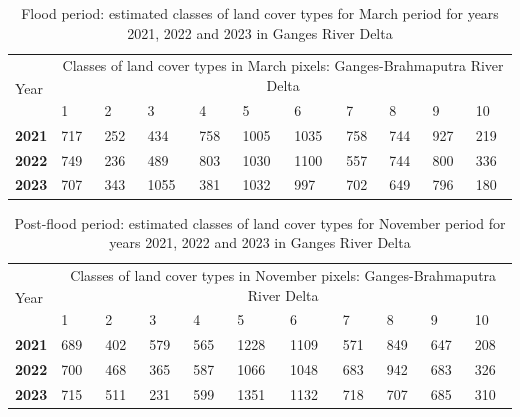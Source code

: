 \documentclass[water,article,submit,pdftex,moreauthors]{Definitions/mdpi}
\begin{document}
\begin{table}[H]
\caption{Flood period: estimated classes of land cover types for March period for years 2021, 2022 and 2023 in Ganges River Delta}
  \centering
  \begin{tabularx}{\textwidth}{p{0.9cm}p{0.9cm}p{0.9cm}p{0.9cm}p{0.9cm}p{0.9cm}p{0.9cm}p{0.9cm}p{0.9cm}p{0.9cm}p{0.9cm}}
  \toprule
  \multirow{2}{*}{Year} & \multicolumn{10}{c}{Classes of land cover types in March pixels: Ganges-Brahmaputra River Delta} \\
     & 1 & 2 & 3 & 4 & 5 & 6 & 7 & 8 & 9 & 10 \\
    \midrule
    \textbf{2021} & 717 & 252 & 434 & 758 & 1005 & 1035 & 758 & 744 & 927 & 219 \\
    \textbf{2022} &  749 & 236 & 489 & 803 & 1030 & 1100 & 557 & 744 & 800 & 336 \\
     \textbf{2023} &  707 & 343 & 1055 & 381 & 1032 & 997 & 702 & 649 & 796 & 180 \\
\bottomrule
\end{tabularx}
  \label{tab02}
\end{table}

\begin{table}[H]
 \caption{Post-flood period: estimated classes of land cover types for November period for years 2021, 2022 and 2023 in Ganges River Delta}
  \centering
  \begin{tabularx}{\textwidth}{p{0.9cm}p{0.9cm}p{0.9cm}p{0.9cm}p{0.9cm}p{0.9cm}p{0.9cm}p{0.9cm}p{0.9cm}p{0.9cm}p{0.9cm}}
  \toprule
  \multirow{2}{*}{Year} & \multicolumn{10}{c}{Classes of land cover types in November pixels: Ganges-Brahmaputra River Delta} \\
     & 1 & 2 & 3 & 4 & 5 & 6 & 7 & 8 & 9 & 10 \\
    \midrule
    \textbf{2021} & 689 & 402 & 579 & 565 & 1228 & 1109 & 571 & 849 & 647 & 208 \\
    \textbf{2022} & 700 & 468 & 365 & 587 & 1066 & 1048 & 683 & 942 & 683 & 326 \\
     \textbf{2023} & 715 & 511 & 231 & 599 & 1351 & 1132 & 718 & 707 & 685 & 310 \\
\bottomrule
\end{tabularx}
  \label{tab03}
\end{table}
\end{document}
